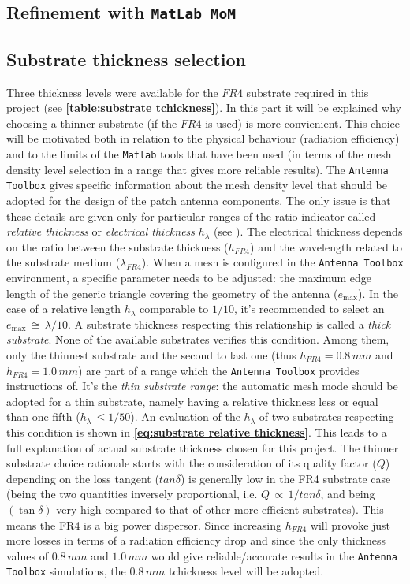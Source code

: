 \documentclass[12pt,a4paper]{article}
\begin{document}
{\subsection*{Refinement with \texttt{\color{BurntOrange}MatLab MoM}}
\subsection*{Substrate thickness selection}Three thickness levels were available for the $FR4$ substrate required in this project (see \textbf{\cref{table:substrate tchickness}}). In this part it will be explained why choosing a thinner substrate (if the $FR4$ is used) is more convienient. This choice will be motivated both in relation to the physical behaviour (radiation efficiency) and to the limits of the \texttt{\color{BurntOrange}Matlab} tools that have been used (in terms of the mesh density level selection in a range that gives more reliable results). \FloatBarrier
The \texttt{\color{Mahogany}Antenna Toolbox} gives specific
information about the mesh density level that should be adopted for the design of the patch antenna components. The only issue is that these details are given only for particular ranges of the ratio indicator called \emph{relative thickness} or \emph{electrical thickness} $h_{\lambda}$ (see \textbf{\cite{makarov}}). The electrical thickness depends on the ratio between the substrate thickness ($h_{FR4}$) and the wavelength related to the substrate medium ($\lambda_{FR4}$). When a mesh is configured in the \texttt{\color{Mahogany}Antenna Toolbox} environment, a specific parameter needs to be adjusted: the maximum edge length of the generic triangle covering the geometry of the antenna ($e_{\max}$). In the case of a relative length $h_\lambda$ comparable to $1/10$, it's recommended to select an $e_{\max}\,\cong\,\lambda/10$. A substrate thickness respecting this relationship is called a \emph{thick substrate}. None of the available substrates verifies this condition. Among them, only the thinnest substrate and the second to last one (thus $h_{FR4}=0.8\,mm$ and $h_{FR4}=1.0\,mm$) are part of a range which the \texttt{\color{Mahogany}Antenna Toolbox} provides instructions of. It's the \emph{thin substrate range}: the automatic mesh mode should be adopted for a thin substrate, namely having a relative thickness less or equal than one fifth ($h_\lambda\,\leq{1/50}$). An evaluation of the $h_\lambda$ of two substrates respecting this condition is shown in \textbf{\cref{eq:substrate relative thickness}}. This leads to a full explanation of actual substrate thickness chosen for this project. The thinner substrate choice rationale starts with the consideration of its quality factor ($Q$) depending on the loss tangent ($tan\delta$) is generally low in the FR4 substrate case (being the two quantities inversely proportional, i.e. $Q\,\propto\,1/tan\delta$, and being $(\tan\delta)$ very high compared to that of other more efficient substrates). This means the FR4 is a big power dispersor. Since increasing $h_{FR4}$ will provoke just more losses in terms of a radiation efficiency drop and since the only thickness values of $0.8\,mm$ and $1.0\,mm$ would give reliable/accurate results in the \texttt{\color{Mahogany}Antenna Toolbox} simulations, the $0.8\,mm$ tchickness level will be adopted. 
}
\end{document}
